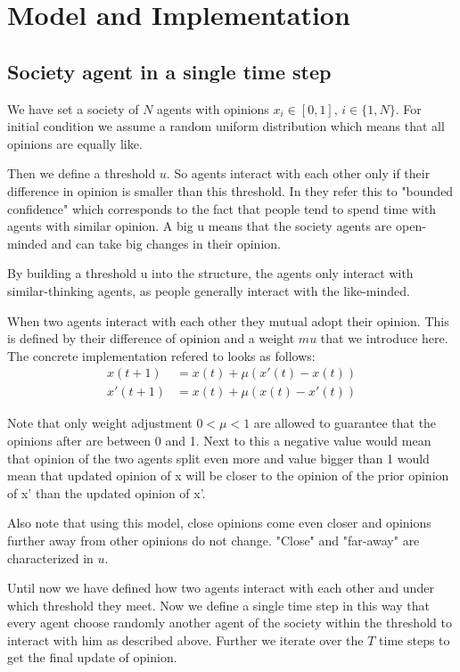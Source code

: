 \documentclass[11pt]{article}
\begin{document}
\section{Model and Implementation}
\subsection{Society agent in a single time step}
We have set a society of $N$ agents with opinions $x_i \in [0,1]$, $i \in \{1, N \}$. For initial condition we assume a random uniform distribution which means that all opinions are equally like.

Then we define a threshold $u$. So agents interact with each other only if their difference in opinion is smaller than this threshold. In \cite{Minor} they refer this to "bounded confidence" which corresponds to the fact that people tend to spend time with agents with similar opinion. A big u means that the society agents are open-minded and can take big changes in their opinion.

By building a threshold u into the structure, the agents only interact with similar-thinking agents, as people generally interact with the like-minded.

When two agents interact with each other they mutual adopt their opinion. This is defined by their difference of opinion and a weight $mu$ that we introduce here. \\

The concrete implementation refered to \cite{Minor} looks as follows:
\begin{equation}
\begin{aligned}
x(t+1) &= x(t) + \mu(x'(t) - x(t))  \\
x'(t+1) &= x(t) + \mu(x(t) - x'(t)) 
\end{aligned}
\end{equation}

Note that only weight adjustment $0 < \mu < 1$ are allowed to guarantee that the opinions after are between 0 and 1. Next to this a negative value would mean that opinion of the two agents split even more and value bigger than 1 would mean that updated opinion of x will be closer to the opinion of the prior opinion of x' than the updated opinion of x'. 

Also note that using this model, close opinions come even closer and opinions further away from other opinions do not change. "Close" and "far-away" are characterized in $u$.

Until now we have defined how two agents interact with each other and under which threshold they meet. Now we define a single time step in this way that every agent choose randomly another agent of the society within the threshold to interact with him as described above. Further we iterate over the $T$ time steps to get the final update of opinion.
\end{document}
